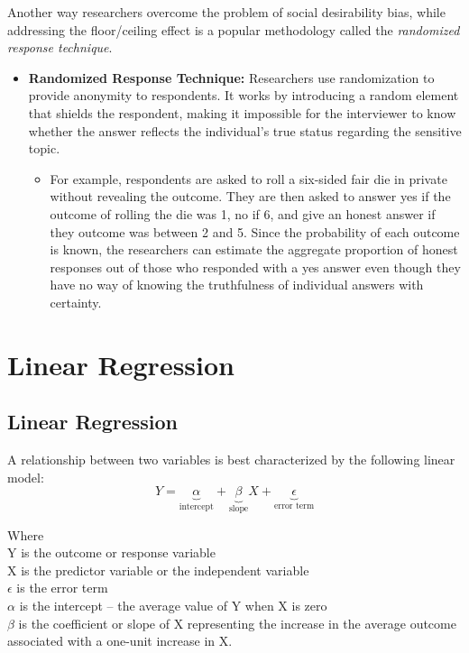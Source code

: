 \documentclass{article}
\begin{document}
    \noindent Another way researchers overcome the problem of social
desirability bias, while addressing the floor/ceiling effect is a popular
methodology called the \textit{randomized response technique}.
    \begin{itemize}
        \item \textbf{Randomized Response Technique:} Researchers use
        randomization to provide anonymity to respondents. It works by
        introducing a random element that shields the respondent, making it
        impossible for the interviewer to know whether the answer reflects
        the individual's true status regarding the sensitive topic.
        \begin{itemize}
            \item For example, respondents are asked to roll a six-sided
            fair die in private without revealing the outcome. They are then
            asked to answer yes if the outcome of rolling the die was 1, no
            if 6, and give an honest answer if they outcome was between 2
            and 5. Since the probability of each outcome is known, the
            researchers can estimate the aggregate proportion of honest
            responses out of those who responded with a yes answer even
            though they have no way of knowing the truthfulness of
            individual answers with certainty.
        \end{itemize}
    \end{itemize}

\section{Linear Regression}
    \subsection{Linear Regression}

    \noindent A relationship between two variables is best characterized by
the following linear model:\\

    \[
        Y = \underbrace{\alpha}_{\text{intercept}} + \underbrace{\beta}_{\text{slope}}X + \underbrace{\epsilon}_{\text{error term}}
    \]

    \indent Where\\
    \indent \indent Y is the outcome or response variable\\
    \indent \indent X is the predictor variable or the independent variable\\
    \indent \indent $\epsilon$ is the error term\\
    \indent \indent $\alpha$ is the intercept -- the average value of Y when
X is zero\\
    \indent \indent $\beta$ is the coefficient or slope of X representing
the increase in the average outcome associated with a one-unit increase in X.\\
\end{document}
